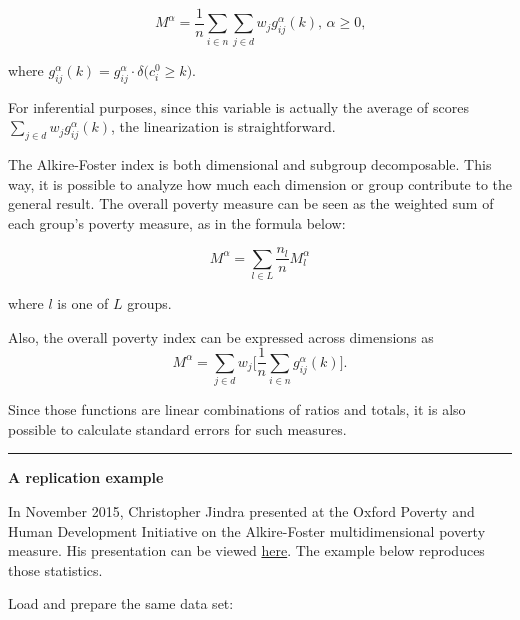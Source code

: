 \documentclass[]{book}
\begin{document}
\[
M^\alpha = \frac{1}{n} \sum_{i \in n} \sum_{j \in d} w_j g_{ij}^{\alpha}(k) \text{, } \alpha \geq 0 \text{,}
\]

where \(g_{ij}^{\alpha}(k) = g_{ij}^\alpha \cdot \delta \big( c^0_i \geqslant k \big)\).

For inferential purposes, since this variable is actually the average of scores \(\sum_{j \in d} w_j g_{ij}^{\alpha}(k)\), the linearization is straightforward.

The Alkire-Foster index is both dimensional and subgroup decomposable. This way, it is possible to analyze how much each dimension or group contribute to the general result. The overall poverty measure can be seen as the weighted sum of each group's poverty measure, as in the formula below:

\[
M^\alpha = \sum_{l \in L} \frac{ n_l }{ n } M^\alpha_{l}
\]

where \(l\) is one of \(L\) groups.

Also, the overall poverty index can be expressed across dimensions as
\[
M^\alpha = \sum_{j \in d} w_j \bigg[ \frac{1}{n} \sum_{i \in n} g_{ij}^\alpha (k) \bigg] \text{.}
\]

Since those functions are linear combinations of ratios and totals, it is also possible to calculate standard errors for such measures.

\begin{center}\rule{0.5\linewidth}{0.5pt}\end{center}

\textbf{A replication example}

In November 2015, Christopher Jindra presented at the Oxford Poverty and Human Development Initiative on the Alkire-Foster multidimensional poverty measure. His presentation can be viewed \href{http://www.ophi.org.uk/wp-content/uploads/Jindra_151109_OPHISeminar.pdf}{here}. The example below reproduces those statistics.

Load and prepare the same data set:
\end{document}
